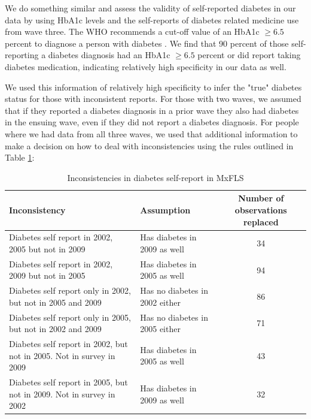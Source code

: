 \documentclass[12pt,english,british]{article}
\providecommand{\tabularnewline}{\\}
\begin{document}
\begin{appendix}
We do something similar and assess the validity of self-reported diabetes in our data
by using \ac{HbA1c} levels and the self-reports of diabetes
related medicine use from wave three. The \ac{WHO}
recommends a cut-off value of an \ac{HbA1c} $\geq6.5$ percent
to diagnose a person with diabetes \citep{WorldHealthOrganization2011}.
We find that 90 percent of those self-reporting a diabetes diagnosis had an \ac{HbA1c} $\geq6.5$ percent
or did report taking diabetes medication, indicating relatively high specificity in our data as well.

We used this information of relatively high specificity to infer the "true" diabetes status for those with inconsistent reports. For those with two waves, we assumed that if
they reported a diabetes diagnosis in a prior wave they also had diabetes
in the ensuing wave, even if they did not report a diabetes diagnosis.
For people where we had data from all three waves, we used that
additional information to make a decision on how to deal with inconsistencies
using the rules outlined in Table \ref{tab:Inconsistencies}:

\begin{table}[h!]
\caption{\label{tab:Inconsistencies}Inconsistencies in diabetes self-report in MxFLS}
\begin{center}
\begin{adjustbox}{max width=\textwidth}
\begin{tabular}{llc}
\hline 
Inconsistency  & Assumption  & Number of observations replaced\tabularnewline
\hline 
Diabetes self report in 2002, 2005 but not in 2009  & Has diabetes in 2009 as well  & 34\tabularnewline
Diabetes self report in 2002, 2009 but not in 2005  & Has diabetes in 2005 as well  & 94\tabularnewline
Diabetes self report only in 2002, but not in 2005 and 2009  & Has no diabetes in 2002 either  & 86\tabularnewline
Diabetes self report only in 2005, but not in 2002 and 2009  & Has no diabetes in 2005 either  & 71\tabularnewline
Diabetes self report in 2002, but not in 2005. Not in survey in 2009  & Has diabetes in 2005 as well  & 43\tabularnewline
Diabetes self report in 2005, but not in 2009. Not in survey in 2002  & Has diabetes in 2009 as well  & 32\tabularnewline
\end{tabular}
\end{adjustbox}
\end{center}
\end{table}



\end{appendix}
\end{document}
